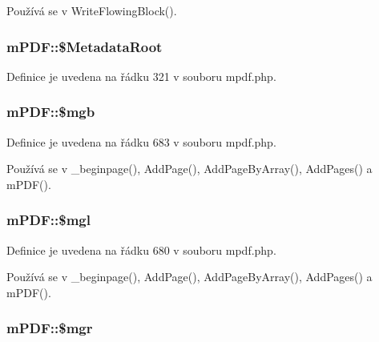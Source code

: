 Používá se v Write\-Flowing\-Block().

\hypertarget{classm_p_d_f_ab39f10c38c429a78a2fb66d8e60c285d}{
\subsubsection[{\$\-Metadata\-Root}]{\setlength{\rightskip}{0pt plus 5cm}m\-P\-D\-F\-::\$\-Metadata\-Root}}\label{classm_p_d_f_ab39f10c38c429a78a2fb66d8e60c285d}


Definice je uvedena na řádku 321 v souboru mpdf.\-php.

\hypertarget{classm_p_d_f_a670402dbc0e6fc7d191b32183200d64c}{
\subsubsection[{\$mgb}]{\setlength{\rightskip}{0pt plus 5cm}m\-P\-D\-F\-::\$mgb}}\label{classm_p_d_f_a670402dbc0e6fc7d191b32183200d64c}


Definice je uvedena na řádku 683 v souboru mpdf.\-php.



Používá se v \-\_\-beginpage(), Add\-Page(), Add\-Page\-By\-Array(), Add\-Pages() a m\-P\-D\-F().

\hypertarget{classm_p_d_f_a7f894210581b4f636ef8d71719c9c0dc}{
\subsubsection[{\$mgl}]{\setlength{\rightskip}{0pt plus 5cm}m\-P\-D\-F\-::\$mgl}}\label{classm_p_d_f_a7f894210581b4f636ef8d71719c9c0dc}


Definice je uvedena na řádku 680 v souboru mpdf.\-php.



Používá se v \-\_\-beginpage(), Add\-Page(), Add\-Page\-By\-Array(), Add\-Pages() a m\-P\-D\-F().

\hypertarget{classm_p_d_f_a5eaeea9417e7c5d6aff2c545c23a98a1}{
\subsubsection[{\$mgr}]{\setlength{\rightskip}{0pt plus 5cm}m\-P\-D\-F\-::\$mgr}}\label{classm_p_d_f_a5eaeea9417e7c5d6aff2c545c23a98a1}


